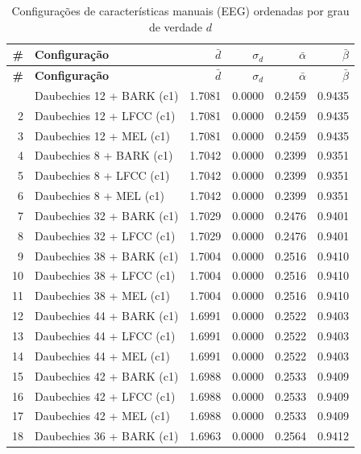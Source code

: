 \begin{longtable}{@{}rlrrrr@{}}
\caption{Configurações de características manuais (EEG) ordenadas por grau de verdade $d$} \label{tab:phase00hc_eeg} \\
\toprule
\textbf{\#} & \textbf{Configuração} & \textbf{$\bar{d}$} & \textbf{$\sigma_d$} & \textbf{$\bar{\alpha}$} & \textbf{$\bar{\beta}$} \\
\midrule
\endfirsthead
\toprule
\textbf{\#} & \textbf{Configuração} & \textbf{$\bar{d}$} & \textbf{$\sigma_d$} & \textbf{$\bar{\alpha}$} & \textbf{$\bar{\beta}$} \\
\midrule
\endhead
\bottomrule
\endfoot
1 & Daubechies 12 + BARK (c1) & 1.7081 & 0.0000 & 0.2459 & 0.9435 \\
2 & Daubechies 12 + LFCC (c1) & 1.7081 & 0.0000 & 0.2459 & 0.9435 \\
3 & Daubechies 12 + MEL (c1) & 1.7081 & 0.0000 & 0.2459 & 0.9435 \\
4 & Daubechies 8 + BARK (c1) & 1.7042 & 0.0000 & 0.2399 & 0.9351 \\
5 & Daubechies 8 + LFCC (c1) & 1.7042 & 0.0000 & 0.2399 & 0.9351 \\
6 & Daubechies 8 + MEL (c1) & 1.7042 & 0.0000 & 0.2399 & 0.9351 \\
7 & Daubechies 32 + BARK (c1) & 1.7029 & 0.0000 & 0.2476 & 0.9401 \\
8 & Daubechies 32 + LFCC (c1) & 1.7029 & 0.0000 & 0.2476 & 0.9401 \\
9 & Daubechies 38 + BARK (c1) & 1.7004 & 0.0000 & 0.2516 & 0.9410 \\
10 & Daubechies 38 + LFCC (c1) & 1.7004 & 0.0000 & 0.2516 & 0.9410 \\
11 & Daubechies 38 + MEL (c1) & 1.7004 & 0.0000 & 0.2516 & 0.9410 \\
12 & Daubechies 44 + BARK (c1) & 1.6991 & 0.0000 & 0.2522 & 0.9403 \\
13 & Daubechies 44 + LFCC (c1) & 1.6991 & 0.0000 & 0.2522 & 0.9403 \\
14 & Daubechies 44 + MEL (c1) & 1.6991 & 0.0000 & 0.2522 & 0.9403 \\
15 & Daubechies 42 + BARK (c1) & 1.6988 & 0.0000 & 0.2533 & 0.9409 \\
16 & Daubechies 42 + LFCC (c1) & 1.6988 & 0.0000 & 0.2533 & 0.9409 \\
17 & Daubechies 42 + MEL (c1) & 1.6988 & 0.0000 & 0.2533 & 0.9409 \\
18 & Daubechies 36 + BARK (c1) & 1.6963 & 0.0000 & 0.2564 & 0.9412 \\

\end{longtable}
